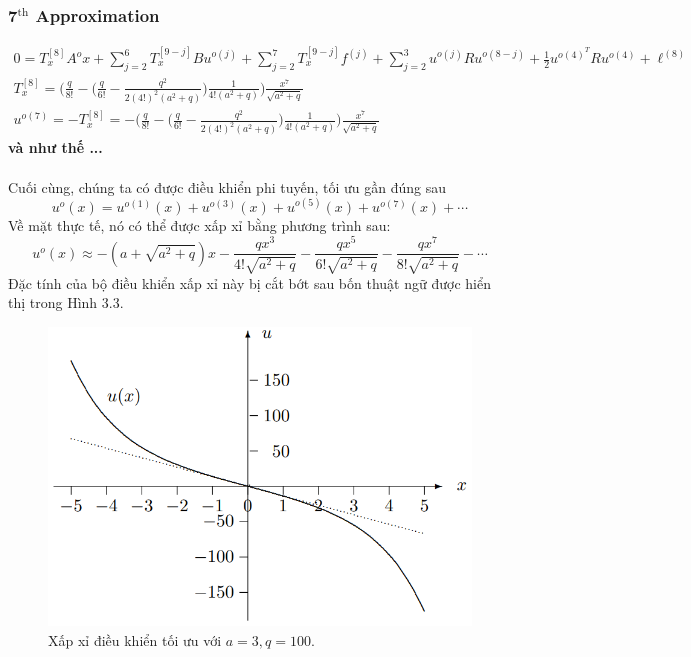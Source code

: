 \documentclass[12pt,a4paper]{report}
\begin{document}
\subsubsection{\textbf{7}$^{\text{th}}$ Approximation}
\begin{align}
	0=T_x^{[8]}A^ox + \sum_{j=2}^{6}T_x^{[9-j]}Bu^{o(j)} + \sum_{j=2}^{7}T_x^{[9-j]}f^{(j)} + \sum_{j=2}^{3}u^{o(j)}Ru^{o(8-j)}+\frac{1}{2}u^{o(4)^T}Ru^{o(4)} + \ell^{(8)} \nonumber \\ T_x^{[8]} = \bigg(\frac{q}{8!} - \Big(\frac{q}{6!}-\frac{q^2}{2(4!)^2(a^2+q)}\Big)\frac{1}{4!(a^2+q)}\bigg)\frac{x^7}{\sqrt{a^2+q}} \nonumber \\ u^{o(7)} = -T_x^{[8]} = -\bigg(\frac{q}{8!} - \Big(\frac{q}{6!}-\frac{q^2}{2(4!)^2(a^2+q)}\Big)\frac{1}{4!(a^2+q)}\bigg)\frac{x^7}{\sqrt{a^2+q}} \nonumber
\end{align}
\textbf{và như thế ...} \\\\Cuối cùng, chúng ta có được điều khiển phi tuyến, tối ưu gần đúng sau $$u^o(x) = u^{o(1)}(x) + u^{o(3)}(x) + u^{o(5)}(x) + u^{o(7)}(x) + \cdots $$ Về mặt thực tế, nó có thể được xấp xỉ bằng phương trình sau: $$u^o(x) \approx -(a+\sqrt{a^2 + q})x - 
\frac{qx^3}{4!\sqrt{a^2+q}} - \frac{qx^5}{6!\sqrt{a^2+q}} - \frac{qx^7}{8!\sqrt{a^2+q}}-\cdots$$ Đặc tính của bộ điều khiển xấp xỉ này bị cắt bớt sau bốn thuật ngữ được hiển thị trong Hình 3.3.
\begin{figure}[h]
	\centering
	\includegraphics[scale=.55]{hinh5.png}
	\caption{Xấp xỉ điều khiển tối ưu với $a = 3, q = 100$.}
\end{figure}
\end{document}
